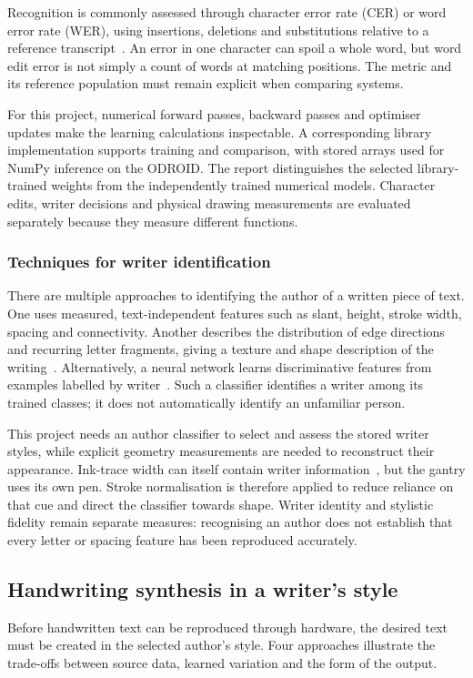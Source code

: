 Recognition is commonly assessed through character error rate (CER) or word error rate (WER), using insertions, deletions and substitutions relative to a reference transcript~\cite[p.~2]{graves2006}. An error in one character can spoil a whole word, but word edit error is not simply a count of words at matching positions. The metric and its reference population must remain explicit when comparing systems.

For this project, numerical forward passes, backward passes and optimiser updates make the learning calculations inspectable. A corresponding library implementation supports training and comparison, with stored arrays used for NumPy inference on the ODROID. The report distinguishes the selected library-trained weights from the independently trained numerical models. Character edits, writer decisions and physical drawing measurements are evaluated separately because they measure different functions.

\subsubsection{Techniques for writer identification}
There are multiple approaches to identifying the author of a written piece of text. One uses measured, text-independent features such as slant, height, stroke width, spacing and connectivity. Another describes the distribution of edge directions and recurring letter fragments, giving a texture and shape description of the writing~\cite[p.~701]{bulacu2007}. Alternatively, a neural network learns discriminative features from examples labelled by writer~\cite{he2020}. Such a classifier identifies a writer among its trained classes; it does not automatically identify an unfamiliar person.

This project needs an author classifier to select and assess the stored writer styles, while explicit geometry measurements are needed to reconstruct their appearance. Ink-trace width can itself contain writer information~\cite[p.~162]{brink2012}, but the gantry uses its own pen. Stroke normalisation is therefore applied to reduce reliance on that cue and direct the classifier towards shape. Writer identity and stylistic fidelity remain separate measures: recognising an author does not establish that every letter or spacing feature has been reproduced accurately.

\subsection{Handwriting synthesis in a writer's style}
\label{sec:lit-synth}
Before handwritten text can be reproduced through hardware, the desired text must be created in the selected author's style. Four approaches illustrate the trade-offs between source data, learned variation and the form of the output.

